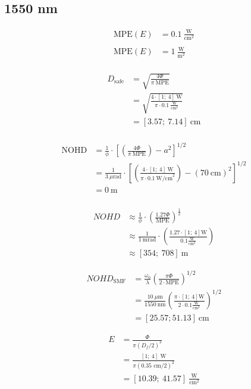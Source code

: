 \documentclass[a4paper]{article}
\begin{document}
\subsection*{1550 nm}
\begin{align*}
\textrm{MPE}(E) &= 0.1 \ \frac{\textrm{W}}{\textrm{cm}^2} \\
\\
\textrm{MPE}(E) &= 1 \ \frac{\textrm{W}}{\textrm{m}^2} \\
\end{align*}


\begin{align*}
D_{\textrm{safe}} &= \sqrt{\frac{4\Phi}{\pi\ \textrm{MPE}}} \\
	&= \sqrt{\frac{4\cdot [1;\ 4]\ \textrm{W}}{\pi \cdot 0.1 \ \frac{\textrm{W}}{\textrm{cm}^2}}}\\
	&= [3.57;\ 7.14] \ \textrm{cm}\\
\end{align*}

\begin{align*}
\textrm{NOHD} &= \frac{1}{\phi}\cdot \left[ \left(\frac{4\Phi}{\pi\ \textrm{MPE}}\right)-a^2\right]^{1/2}\\
	&= \frac{1}{3\ \mu \textrm{rad}}\cdot \left[ \left(\frac{4\cdot [1;\ 4]\ \textrm{W}}{\pi\cdot 0.1\ \textrm{W/cm}^2}\right)-(70\ \textrm{cm})^2\right]^{1/2} \\
	&= 0\ \textrm{m}\\
\end{align*}

\begin{align*}
NOHD &\approx \frac{1}{\phi}\cdot\left(\frac{1.27\Phi}{\textrm{MPE}}\right)^{\frac{1}{2}}\\
	&\approx \frac{1}{1\ \textrm{mrad}}\cdot\left(\frac{1.27\cdot[1;\ 4]\textrm{W}}{0.1\frac{\textrm{W}}{\textrm{cm}^2}}\right)\\
	&\approx [354;\ 708]\ \textrm{m}
\end{align*}

\begin{align*}
NOHD_{\textrm{SMF}} &= \frac{\omega_0}{\lambda}\left(\frac{\pi\Phi}{2\cdot\textrm{MPE}}\right)^{1/2}\\
	&= \frac{10\ \mu \textrm{m}}{1550\ \textrm{nm}}\left(\frac{\pi\cdot[1;\ 4]\textrm{W}}{2\cdot 0.1\frac{\textrm{W}}{\textrm{cm}^2}}\right)^{1/2}\\
	&= [25.57; 51.13]\ \textrm{cm}	
\end{align*}

\begin{align*}
E &= \frac{\Phi}{\pi (D_f/2)^2}  \\
  &= \frac{[1;\ 4] \textrm{ W}}{\pi (0.35 \textrm{ cm}/2)^2} \\
  &= [10.39;\ 41.57] \ \frac{\textrm{W}}{\textrm{cm}^2}\\
\end{align*}
\end{document}
